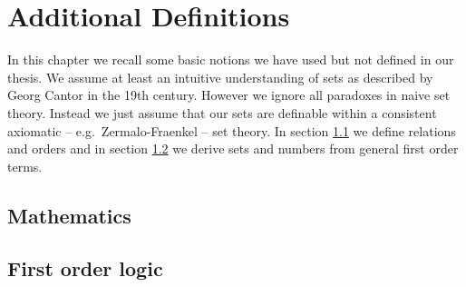 
\chapter{Additional Definitions}



In this chapter we recall some basic notions we have used but not defined in our thesis.
We assume at least an {\myem intuitive} understanding of sets as described by Georg Cantor in the 19th century. 
However we ignore all paradoxes in {\myem naive} set theory.
Instead we just assume that our sets are definable within a consistent axiomatic 
-- e.g.~Zermalo-Fraenkel -- set theory.
In section \ref{sec:app:maths} we define relations and orders and in
section \ref{sec:app:fol} we derive sets and numbers from general first order terms.

\section{Mathematics}\label{sec:app:maths}



\section{First order logic}\label{sec:app:fol}



